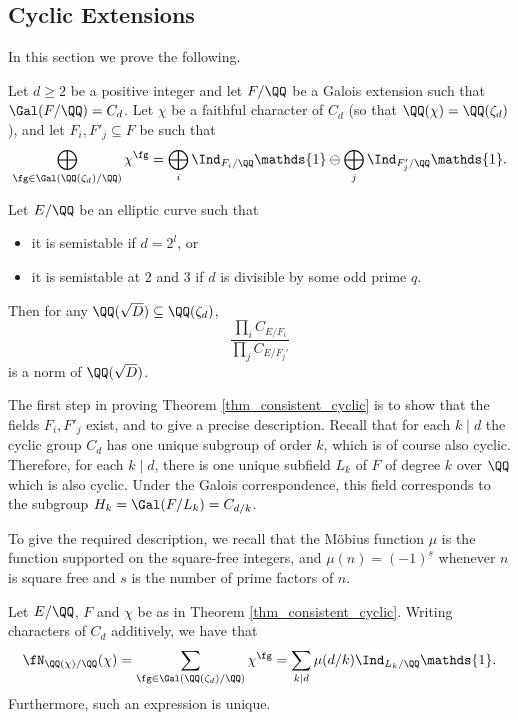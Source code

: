 \subsection{Cyclic Extensions}
In this section we prove the following. 
\begin{thm}\label{thm_consistent_cyclic}
    Let $d\geq2$ be a positive integer and let $F/\QQ$ be a Galois extension such that $\Gal(F/\QQ)=C_d$. Let $\chi$ be a faithful character of $C_d$ (so that $\QQ(\chi)=\QQ(\zeta_d)$), and let $F_i,F'_j\subseteq F$ be such that
    $$\bigoplus_{\fg\in\Gal(\QQ(\zeta_d)/\QQ)}\chi^{\fg}=\bigoplus_i\Ind_{F_i/\QQ}\mathds{1}\ominus\bigoplus_j\Ind_{F'_j/\QQ}\mathds{1}.$$

    Let $E/\QQ$ be an elliptic curve such that
    \begin{itemize}
        \item it is semistable if $d=2^l$, or
        \item it is semistable at $2$ and $3$ if $d$ is divisible by some odd prime $q$.
    \end{itemize}

    Then for any $\QQ(\sqrt{D})\subseteq\QQ(\zeta_d)$,
    $$\frac{\prod_i C_{E/F_i}}{\prod_j C_{E/F_j'}}$$
    is a norm of $\QQ(\sqrt{D})$. 
\end{thm}

The first step in proving Theorem \ref{thm_consistent_cyclic} is to show that the fields $F_i, F'_j$ exist, and to give a precise description. Recall that for each $k\mid d$ the cyclic group $C_d$ has one unique subgroup of order $k$, which is of course also cyclic. Therefore, for each $k\mid d$, there is one unique subfield $L_k$ of $F$ of degree $k$ over $\QQ$ which is also cyclic. Under the Galois correspondence, this field corresponds to the subgroup $H_k=\Gal(F/L_k)=C_{d/k}$.

To give the required description, we recall that the Möbius function $\mu$ is the function supported on the square-free integers, and $\mu(n)=(-1)^s$ whenever $n$ is square free and $s$ is the number of prime factors of $n$.

\begin{lemma}\label{lem_cyclic_decomp}
    Let $E/\QQ$, $F$ and $\chi$ be as in Theorem \ref{thm_consistent_cyclic}. Writing characters of $C_d$ additively, we have that
    \begin{equation}\label{eqn_cyclic_relation}
        \fN_{\QQ(\chi)/\QQ}(\chi)=\sum_{\fg\in\Gal(\QQ(\zeta_d)/\QQ)}\chi^{\fg}=\sum_{k\mid d}\mu(d/k)\Ind_{L_k/\QQ}\mathds{1}.
    \end{equation}
    Furthermore, such an expression is unique.
\end{lemma}

